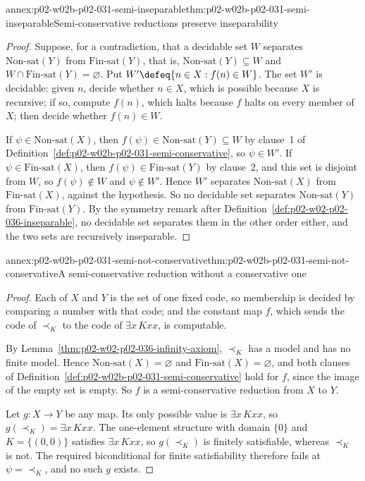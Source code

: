 \begin{annexitem}{annex:p02-w02b-p02-031-semi-inseparable}{thm:p02-w02b-p02-031-semi-inseparable}{Semi-conservative reductions preserve inseparability}
\begin{proof}
Suppose, for a contradiction, that a decidable set \(W\) separates
\(\mathrm{Non\text{-}sat}(Y)\) from \(\mathrm{Fin\text{-}sat}(Y)\), that is,
\(\mathrm{Non\text{-}sat}(Y)\subseteq W\) and
\(W\cap\mathrm{Fin\text{-}sat}(Y)=\varnothing\).  Put
\(W'\defeq\{n\in X:f(n)\in W\}\).  The set \(W'\) is decidable: given \(n\),
decide whether \(n\in X\), which is possible because \(X\) is recursive;
if so, compute \(f(n)\), which halts because \(f\) halts on every member of
\(X\); then decide whether \(f(n)\in W\).

If \(\psi\in\mathrm{Non\text{-}sat}(X)\), then
\(f(\psi)\in\mathrm{Non\text{-}sat}(Y)\subseteq W\) by clause~1 of
Definition~\ref{def:p02-w02b-p02-031-semi-conservative}, so \(\psi\in W'\).
If \(\psi\in\mathrm{Fin\text{-}sat}(X)\), then
\(f(\psi)\in\mathrm{Fin\text{-}sat}(Y)\) by clause~2, and this set is disjoint
from \(W\), so \(f(\psi)\notin W\) and \(\psi\notin W'\).  Hence \(W'\)
separates \(\mathrm{Non\text{-}sat}(X)\) from \(\mathrm{Fin\text{-}sat}(X)\),
against the hypothesis.  So no decidable set separates
\(\mathrm{Non\text{-}sat}(Y)\) from \(\mathrm{Fin\text{-}sat}(Y)\).  By the
symmetry remark after Definition~\ref{def:p02-w02-p02-036-inseparable}, no
decidable set separates them in the other order either, and the two sets are
recursively inseparable.
\end{proof}
\end{annexitem}

\begin{annexitem}{annex:p02-w02b-p02-031-semi-not-conservative}{thm:p02-w02b-p02-031-semi-not-conservative}{A semi-conservative reduction without a conservative one}
\begin{proof}
Each of \(X\) and \(Y\) is the set of one fixed code, so membership is decided
by comparing a number with that code; and the constant map \(f\), which sends
the code of \(\prec_K\) to the code of \(\exists x\,Kxx\), is computable.

By Lemma~\ref{thm:p02-w02-p02-036-infinity-axiom}, \(\prec_K\) has a model and
has no finite model.  Hence \(\mathrm{Non\text{-}sat}(X)=\varnothing\) and
\(\mathrm{Fin\text{-}sat}(X)=\varnothing\), and both clauses of
Definition~\ref{def:p02-w02b-p02-031-semi-conservative} hold for \(f\), since
the image of the empty set is empty.  So \(f\) is a semi-conservative
reduction from \(X\) to \(Y\).

Let \(g:X\to Y\) be any map.  Its only possible value is \(\exists x\,Kxx\),
so \(g(\prec_K)=\exists x\,Kxx\).  The one-element structure with domain
\(\{0\}\) and \(K=\{(0,0)\}\) satisfies \(\exists x\,Kxx\), so \(g(\prec_K)\)
is finitely satisfiable, whereas \(\prec_K\) is not.  The required
biconditional for finite satisfiability therefore fails at
\(\psi=\prec_K\), and no such \(g\) exists.
\end{proof}
\end{annexitem}

